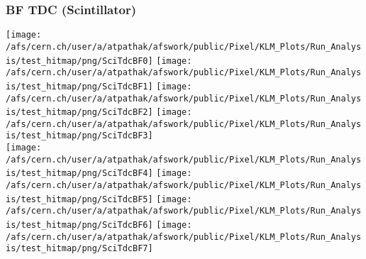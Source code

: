 \documentclass{beamer}
\begin{document}
\begin{frame}
\frametitle{BF TDC (Scintillator)}
\vspace*{.05cm}
\begin{center}
\begin{normalsize}

\vspace*{-.2cm}
\begin{center}

  \texttt{[image: /afs/cern.ch/user/a/atpathak/afswork/public/Pixel/KLM\_Plots/Run\_Analysis/test\_hitmap/png/SciTdcBF0]}
  \texttt{[image: /afs/cern.ch/user/a/atpathak/afswork/public/Pixel/KLM\_Plots/Run\_Analysis/test\_hitmap/png/SciTdcBF1]}
  \texttt{[image: /afs/cern.ch/user/a/atpathak/afswork/public/Pixel/KLM\_Plots/Run\_Analysis/test\_hitmap/png/SciTdcBF2]}
  \texttt{[image: /afs/cern.ch/user/a/atpathak/afswork/public/Pixel/KLM\_Plots/Run\_Analysis/test\_hitmap/png/SciTdcBF3]} \\
  \texttt{[image: /afs/cern.ch/user/a/atpathak/afswork/public/Pixel/KLM\_Plots/Run\_Analysis/test\_hitmap/png/SciTdcBF4]}
  \texttt{[image: /afs/cern.ch/user/a/atpathak/afswork/public/Pixel/KLM\_Plots/Run\_Analysis/test\_hitmap/png/SciTdcBF5]}
  \texttt{[image: /afs/cern.ch/user/a/atpathak/afswork/public/Pixel/KLM\_Plots/Run\_Analysis/test\_hitmap/png/SciTdcBF6]}
  \texttt{[image: /afs/cern.ch/user/a/atpathak/afswork/public/Pixel/KLM\_Plots/Run\_Analysis/test\_hitmap/png/SciTdcBF7]}


\end{center}
\end{normalsize}
\end{center}
\end{frame}
\end{document}
